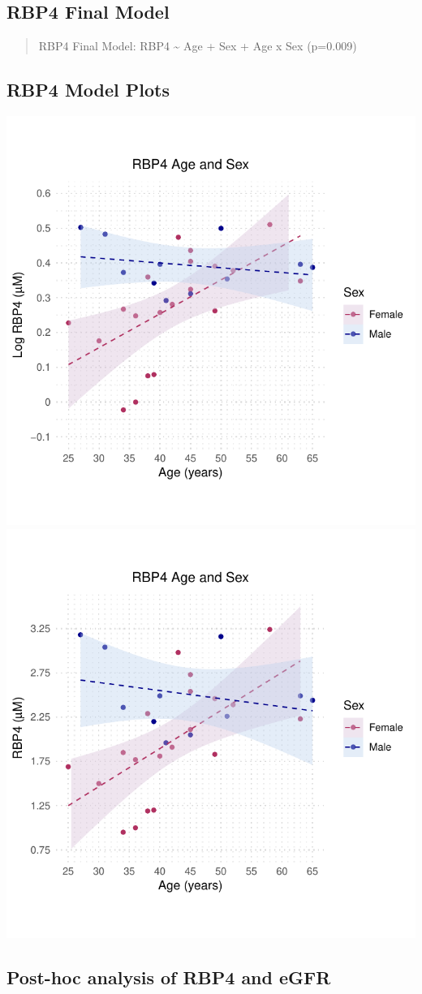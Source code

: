 \documentclass[
]{article}
\begin{document}
\subsection{RBP4 Final Model}\label{rbp4-final-model}

\begin{quote}
RBP4 Final Model: RBP4 \textasciitilde{} Age + Sex + Age x Sex (p=0.009)
\end{quote}

\subsection{RBP4 Model Plots}\label{rbp4-model-plots}

\includegraphics[width=0.5\linewidth]{StatisticalAnalysis_files/figure-latex/plots for RBP4-1}
\includegraphics[width=0.5\linewidth]{StatisticalAnalysis_files/figure-latex/plots for RBP4-2}

\newpage

\subsection{Post-hoc analysis of RBP4 and
eGFR}\label{post-hoc-analysis-of-rbp4-and-egfr}
\end{document}
